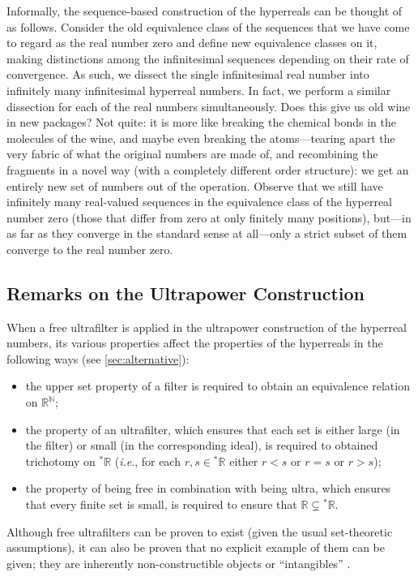 Informally, the sequence-based construction of the hyperreals can be thought of as follows.
Consider the old equivalence class of the sequences that we have come to regard as the real number zero and define new equivalence classes on it, making distinctions among the infinitesimal sequences depending on their rate of convergence. As such, we dissect the single infinitesimal real number into infinitely many infinitesimal hyperreal numbers. In fact, we perform a similar dissection for each of the real numbers simultaneously.
Does this give us old wine in new packages? Not quite: it is more like breaking the chemical bonds in the molecules of the wine, and maybe even breaking the atoms---tearing apart the very fabric of what the original numbers are made of, and recombining the fragments in a novel way (with a completely different order structure): we get an entirely new set of numbers out of the operation.
Observe that we still have infinitely many real-valued sequences in the equivalence class of the hyperreal number zero (those that differ from zero at only finitely many positions), but---in as far as they converge in the standard sense at all---only a strict subset of them converge to the real number zero.

\subsection{Remarks on the Ultrapower Construction}
When a free ultrafilter is applied in the ultrapower construction of the hyperreal numbers, its various properties affect the properties of the hyperreals in the following ways (see \autoref{sec:alternative}):
\begin{itemize}
  \item the upper set property of a filter is required to obtain an equivalence relation on $\mathbb{R}^\mathbb{N}$;
  \item the property of an ultrafilter, which ensures that each set is either large (in the filter) or small (in the corresponding ideal), is required to obtained trichotomy on ${^\ast\mathbb{R}}$ (\textit{i.e}., for each $r,s \in {^\ast\mathbb{R}}$ either $r<s$ or $r=s$ or $r>s$);
  \item the property of being free in combination with being ultra, which ensures that every finite set is small, is required to ensure that $\mathbb{R} \varsubsetneq {^\ast\mathbb{R}}$.
\end{itemize}

Although free ultrafilters can be proven to exist (given the usual set-theoretic assumptions), it can also be proven that no explicit example of them can be given; they are inherently non-constructible objects or ``intangibles'' \citep{Schechter:1997}.

